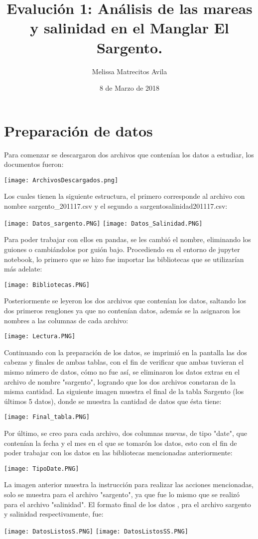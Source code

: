 \documentclass{article}
\title{Evalución 1: Análisis de las mareas y salinidad en el Manglar El Sargento.}
\author{Melissa Matrecitos Avila}
\date{8 de Marzo de 2018}
\begin{document}
\maketitle
\section{Preparación de datos}
Para comenzar se descargaron dos archivos que contenían los datos a estudiar, los documentos fueron:
\begin{center}
    \texttt{[image: ArchivosDescargados.png]}
\end{center}
Los cuales tienen la siguiente estructura, el primero corresponde al archivo con nombre sargento\_201117.csv y el segundo a sargento\-salinidad\-201117.csv:
\begin{center}
    \texttt{[image: Datos\_sargento.PNG]}
    \texttt{[image: Datos\_Salinidad.PNG]}
\end{center}
Para poder trabajar con ellos en pandas, se les cambió el nombre, eliminando los guiones o cambiándolos por guión bajo.
Procediendo en el entorno de jupyter notebook, lo primero que se hizo fue importar las bibliotecas que se utilizarían más adelate:
\begin{center}
    \texttt{[image: Bibliotecas.PNG]}
\end{center}
Posteriormente se leyeron los dos archivos que contenían los datos, saltando los dos primeros renglones ya que no contenían datos, además se la asignaron los nombres a las columnas de cada archivo:
\begin{center}
    \texttt{[image: Lectura.PNG]}
\end{center}
Continuando con la preparación de los datos, se imprimió en la pantalla las dos cabezas y finales de ambas tablas, con el fin de verificar que ambas tuvieran el mismo número de datos, cómo no fue así, se eliminaron los datos extras en el archivo de nombre "sargento", logrando que los dos archivos constaran de la misma cantidad. La siguiente imagen muestra el final de la tabla Sargento (los últimos 5 datos), donde se muestra la cantidad de datos que ésta tiene:
\begin{center}
    \texttt{[image: Final\_tabla.PNG]}
\end{center}
Por último, se creo para cada archivo, dos columnas nuevas, de tipo "date", que contenían la fecha y el mes en el que se tomarón los datos, esto con el fin de poder trabajar con los datos en las bibliotecas mencionadas anteriormente:
\begin{center}
    \texttt{[image: TipoDate.PNG]}
\end{center}
La imagen anterior muestra la instrucción para realizar las acciones mencionadas, solo se muestra para el archivo "sargento", ya que fue lo mismo que se realizó para el archivo "salinidad".
El formato final de los datos , pra el archivo sargento y salinidad respectivamente, fue:
\begin{center}
    \texttt{[image: DatosListosS.PNG]}
    \texttt{[image: DatosListosSS.PNG]}
\end{center}
\end{document}
